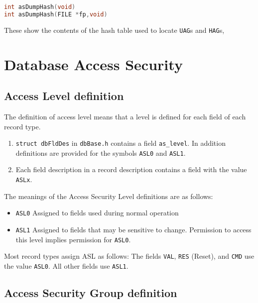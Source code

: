\begin{lstlisting}[language=C]
int asDumpHash(void)
int asDumpHash(FILE *fp,void)
\end{lstlisting}

These show the contents of the hash table used to locate \verb|UAG|s and \verb|HAG|s,

\section{Database Access Security}

\subsection{Access Level definition}

The definition of access level means that a level is defined for each field of each record type.

\begin{enumerate}
\item \verb|struct dbFldDes| in \verb|dbBase.h| contains a field \verb|as_level|.
In addition definitions are provided for the symbols \verb|ASL0| and \verb|ASL1|.

\item Each field description in a record description contains a field with the value \verb|ASLx|.
\end{enumerate}

The meanings of the Access Security Level definitions are as follows:

\begin{itemize}
\item \verb|ASL0| Assigned to fields used during normal operation

\item \verb|ASL1| Assigned to fields that may be sensitive to change.
Permission to access this level implies permission for \verb|ASL0|.
\end{itemize}

Most record types assign ASL as follows:
The fields \verb|VAL|, \verb|RES| (Reset), and \verb|CMD| use the value \verb|ASL0|.
All other fields use \verb|ASL1|.

\subsection{Access Security Group definition}

